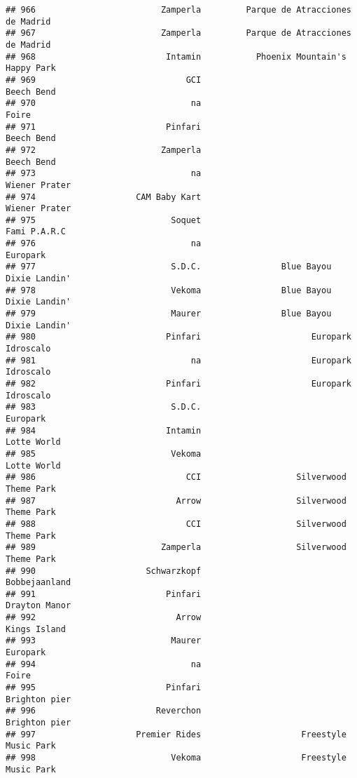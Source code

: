 \documentclass[
]{article}
\begin{document}
\begin{verbatim}
## 966                         Zamperla         Parque de Atracciones de Madrid
## 967                         Zamperla         Parque de Atracciones de Madrid
## 968                          Intamin           Phoenix Mountain's Happy Park
## 969                              GCI                              Beech Bend
## 970                               na                                   Foire
## 971                          Pinfari                              Beech Bend
## 972                         Zamperla                              Beech Bend
## 973                               na                           Wiener Prater
## 974                    CAM Baby Kart                           Wiener Prater
## 975                           Soquet                            Fami P.A.R.C
## 976                               na                                Europark
## 977                           S.D.C.                Blue Bayou Dixie Landin'
## 978                           Vekoma                Blue Bayou Dixie Landin'
## 979                           Maurer                Blue Bayou Dixie Landin'
## 980                          Pinfari                      Europark Idroscalo
## 981                               na                      Europark Idroscalo
## 982                          Pinfari                      Europark Idroscalo
## 983                           S.D.C.                                Europark
## 984                          Intamin                             Lotte World
## 985                           Vekoma                             Lotte World
## 986                              CCI                   Silverwood Theme Park
## 987                            Arrow                   Silverwood Theme Park
## 988                              CCI                   Silverwood Theme Park
## 989                         Zamperla                   Silverwood Theme Park
## 990                      Schwarzkopf                           Bobbejaanland
## 991                          Pinfari                           Drayton Manor
## 992                            Arrow                            Kings Island
## 993                           Maurer                                Europark
## 994                               na                                   Foire
## 995                          Pinfari                           Brighton pier
## 996                        Reverchon                           Brighton pier
## 997                    Premier Rides                    Freestyle Music Park
## 998                           Vekoma                    Freestyle Music Park

\end{verbatim}
\end{document}
